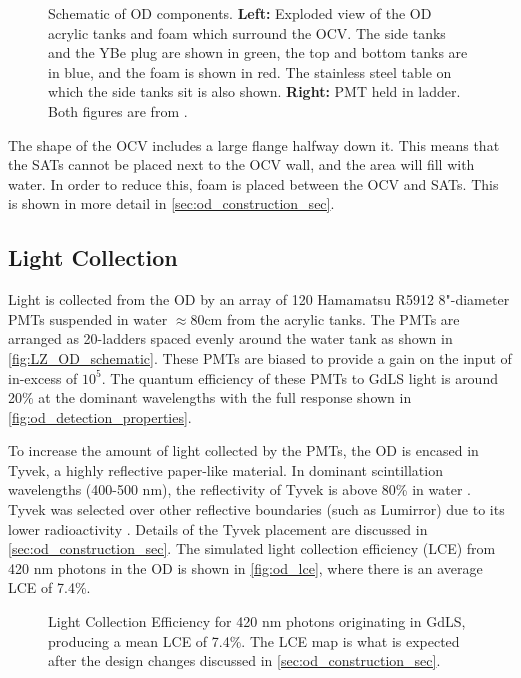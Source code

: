 \begin{figure}[]
\begin{subfigure}{.5\textwidth}
  \end{subfigure}
\caption{Schematic of OD components. \textbf{Left:} Exploded view of the OD acrylic tanks and foam which surround the OCV. The side tanks and the YBe plug are shown in green, the top and bottom tanks are in blue, and the foam is shown in red. The stainless steel table on which the side tanks sit is also shown. \textbf{Right:} PMT held in ladder.
         Both figures are from \cite{LZ_TechnicalDesignReview_ref}.}
\label{fig:LZ_OD_schematic}
\end{figure}

\par
The shape of the OCV includes a large flange halfway down it. 
This means that the SATs cannot be placed next to the OCV wall, and the area will fill with water.
In order to reduce this, foam is placed between the OCV and SATs.
This is shown in more detail in \autoref{sec:od_construction_sec}.

\subsection{Light Collection}
\par
Light is collected from the OD by an array of 120 Hamamatsu R5912 8"-diameter PMTs suspended in water $\approx$80cm from the acrylic tanks.
The PMTs are arranged as 20-ladders spaced evenly around the water tank as shown in \autoref{fig:LZ_OD_schematic}.
These PMTs are biased to provide a gain on the input of in-excess of $10^{5}$.
The quantum efficiency of these PMTs to GdLS light is around 20\% at the dominant wavelengths with the full response shown in \autoref{fig:od_detection_properties}.

\par
To increase the amount of light collected by the PMTs, the OD is encased in Tyvek, a highly reflective paper-like material.
In dominant scintillation wavelengths (400-500 nm), the reflectivity of Tyvek is above 80\% in water \cite{tyvek_thesis_ref,tyvek_reflectivity_ref}. 
Tyvek was selected over other reflective boundaries (such as Lumirror) due to its lower radioactivity \cite{LZ_assay_ref}.
Details of the Tyvek placement are discussed in \autoref{sec:od_construction_sec}.
The simulated light collection efficiency (LCE) from \\ 420 nm photons in the OD is shown in \autoref{fig:od_lce}, where there is an average LCE of 7.4\%.

\begin{figure}
\centering
\resizebox{\textwidth}{!}{

}
\caption[Light Collection Efficiency for 420 nm photons originating in GdLS]{Light Collection Efficiency for 420 nm photons originating in GdLS, producing a mean LCE of 7.4\%.
The LCE map is what is expected after the design changes discussed in \autoref{sec:od_construction_sec}.}
\label{fig:od_lce}
\end{figure}

